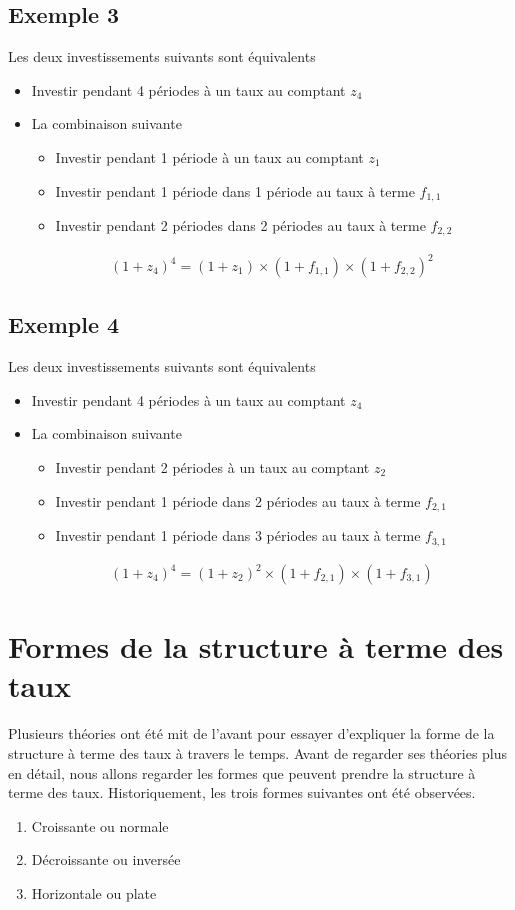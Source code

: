\documentclass[12pt]{article}
\begin{document}
\subsection{Exemple 3}
Les deux investissements suivants sont équivalents
\begin{itemize}
\item Investir pendant 4 périodes à un taux au comptant $z_4$
\item La combinaison suivante
\begin{itemize}
\item Investir pendant 1 période à un taux au comptant $z_1$
\item Investir pendant 1 période dans 1 période au taux à terme $f_{1,1}$
\item Investir pendant 2 périodes dans 2 périodes au taux à terme $f_{2,2}$
\end{itemize}

\begin{align*}
(1+z_4)^4=(1+z_1) \times (1+f_{1,1}) \times (1+f_{2,2})^2
\end{align*}
\end{itemize}

\subsection{Exemple 4}
Les deux investissements suivants sont équivalents
\begin{itemize}
\item Investir pendant 4 périodes à un taux au comptant $z_4$
\item La combinaison suivante
\begin{itemize}
\item Investir pendant 2 périodes à un taux au comptant $z_2$
\item Investir pendant 1 période dans 2 périodes au taux à terme $f_{2,1}$
\item Investir pendant 1 période dans 3 périodes au taux à terme $f_{3,1}$
\end{itemize}
\begin{align*}
(1+z_4)^4=(1+z_2)^2 \times (1+f_{2,1}) \times (1+f_{3,1})
\end{align*}
\end{itemize}

\section{ Formes de la structure à terme des taux}
Plusieurs théories ont été mit de l'avant pour essayer d'expliquer la forme de la structure à terme des taux à travers le temps.  Avant de regarder ses théories plus en détail,  nous allons regarder les formes que peuvent prendre la structure à terme des taux.  Historiquement,  les trois formes suivantes ont été observées.
\begin{enumerate}
\item Croissante ou normale
\item Décroissante ou inversée
\item Horizontale ou plate
\end{enumerate} 
\end{document}
